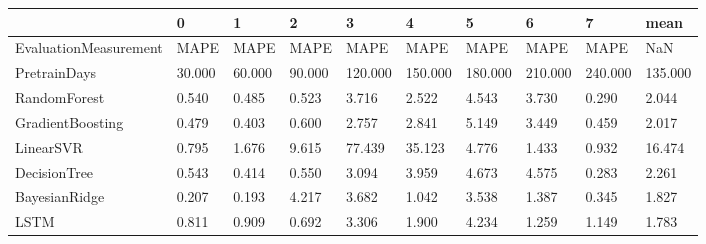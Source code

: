 \begin{tabular}{llllllllll}
\toprule
{} &      0 &      1 &      2 &       3 &       4 &       5 &       6 &       7 &    mean \\
\midrule
EvaluationMeasurement &   MAPE &   MAPE &   MAPE &    MAPE &    MAPE &    MAPE &    MAPE &    MAPE &     NaN \\
PretrainDays          & 30.000 & 60.000 & 90.000 & 120.000 & 150.000 & 180.000 & 210.000 & 240.000 & 135.000 \\
RandomForest          &  0.540 &  0.485 &  0.523 &   3.716 &   2.522 &   4.543 &   3.730 &   0.290 &   2.044 \\
GradientBoosting      &  0.479 &  0.403 &  0.600 &   2.757 &   2.841 &   5.149 &   3.449 &   0.459 &   2.017 \\
LinearSVR             &  0.795 &  1.676 &  9.615 &  77.439 &  35.123 &   4.776 &   1.433 &   0.932 &  16.474 \\
DecisionTree          &  0.543 &  0.414 &  0.550 &   3.094 &   3.959 &   4.673 &   4.575 &   0.283 &   2.261 \\
BayesianRidge         &  0.207 &  0.193 &  4.217 &   3.682 &   1.042 &   3.538 &   1.387 &   0.345 &   1.827 \\
LSTM                  &  0.811 &  0.909 &  0.692 &   3.306 &   1.900 &   4.234 &   1.259 &   1.149 &   1.783 \\
\bottomrule
\end{tabular}
